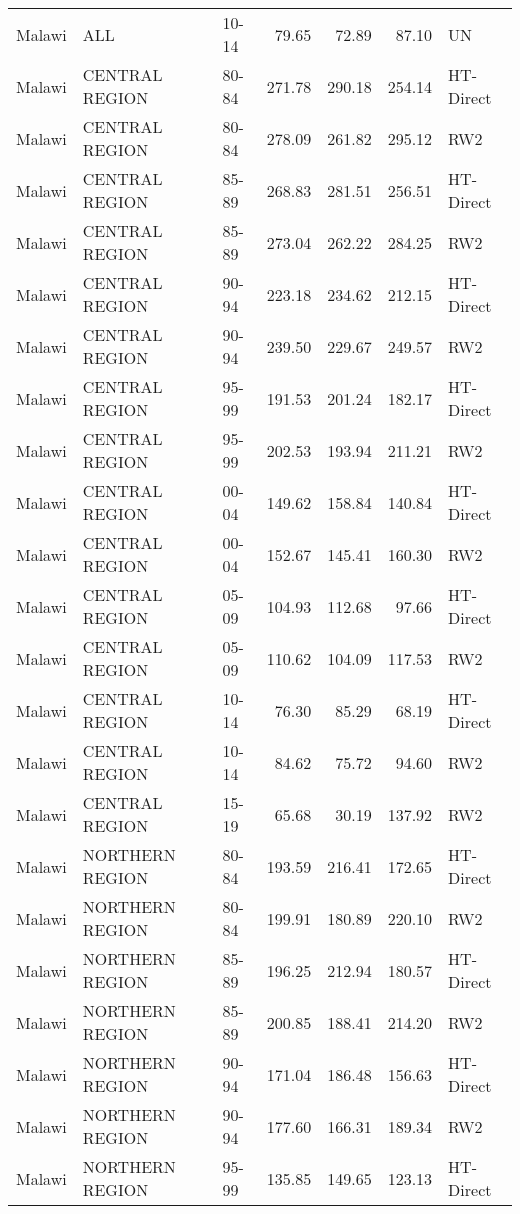 \begin{longtable}{lllrrrl}
  Malawi & ALL & 10-14 & 79.65 & 72.89 & 87.10 & UN \\ 
  Malawi & CENTRAL REGION & 80-84 & 271.78 & 290.18 & 254.14 & HT-Direct \\ 
  Malawi & CENTRAL REGION & 80-84 & 278.09 & 261.82 & 295.12 & RW2 \\ 
  Malawi & CENTRAL REGION & 85-89 & 268.83 & 281.51 & 256.51 & HT-Direct \\ 
  Malawi & CENTRAL REGION & 85-89 & 273.04 & 262.22 & 284.25 & RW2 \\ 
  Malawi & CENTRAL REGION & 90-94 & 223.18 & 234.62 & 212.15 & HT-Direct \\ 
  Malawi & CENTRAL REGION & 90-94 & 239.50 & 229.67 & 249.57 & RW2 \\ 
  Malawi & CENTRAL REGION & 95-99 & 191.53 & 201.24 & 182.17 & HT-Direct \\ 
  Malawi & CENTRAL REGION & 95-99 & 202.53 & 193.94 & 211.21 & RW2 \\ 
  Malawi & CENTRAL REGION & 00-04 & 149.62 & 158.84 & 140.84 & HT-Direct \\ 
  Malawi & CENTRAL REGION & 00-04 & 152.67 & 145.41 & 160.30 & RW2 \\ 
  Malawi & CENTRAL REGION & 05-09 & 104.93 & 112.68 & 97.66 & HT-Direct \\ 
  Malawi & CENTRAL REGION & 05-09 & 110.62 & 104.09 & 117.53 & RW2 \\ 
  Malawi & CENTRAL REGION & 10-14 & 76.30 & 85.29 & 68.19 & HT-Direct \\ 
  Malawi & CENTRAL REGION & 10-14 & 84.62 & 75.72 & 94.60 & RW2 \\ 
  Malawi & CENTRAL REGION & 15-19 & 65.68 & 30.19 & 137.92 & RW2 \\ 
  Malawi & NORTHERN REGION & 80-84 & 193.59 & 216.41 & 172.65 & HT-Direct \\ 
  Malawi & NORTHERN REGION & 80-84 & 199.91 & 180.89 & 220.10 & RW2 \\ 
  Malawi & NORTHERN REGION & 85-89 & 196.25 & 212.94 & 180.57 & HT-Direct \\ 
  Malawi & NORTHERN REGION & 85-89 & 200.85 & 188.41 & 214.20 & RW2 \\ 
  Malawi & NORTHERN REGION & 90-94 & 171.04 & 186.48 & 156.63 & HT-Direct \\ 
  Malawi & NORTHERN REGION & 90-94 & 177.60 & 166.31 & 189.34 & RW2 \\ 
  Malawi & NORTHERN REGION & 95-99 & 135.85 & 149.65 & 123.13 & HT-Direct \\ 

\end{longtable}
